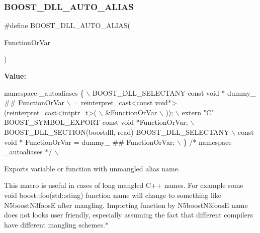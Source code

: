 \subsubsection{\texorpdfstring{B\+O\+O\+S\+T\+\_\+\+D\+L\+L\+\_\+\+A\+U\+T\+O\+\_\+\+A\+L\+I\+AS}{BOOST\_DLL\_AUTO\_ALIAS}}
{\footnotesize\ttfamily \#define B\+O\+O\+S\+T\+\_\+\+D\+L\+L\+\_\+\+A\+U\+T\+O\+\_\+\+A\+L\+I\+AS(\begin{DoxyParamCaption}\item[{}]{Function\+Or\+Var }\end{DoxyParamCaption})}

{\bfseries Value\+:}
\begin{DoxyCode}
\textcolor{keyword}{namespace }\_autoaliases \{                                                                    \(\backslash\)
        BOOST\_DLL\_SELECTANY \textcolor{keyword}{const} \textcolor{keywordtype}{void} * dummy\_ ## FunctionOrVar                                \(\backslash\)
            = \textcolor{keyword}{reinterpret\_cast<}\textcolor{keyword}{const }\textcolor{keywordtype}{void}*\textcolor{keyword}{>}(\textcolor{keyword}{reinterpret\_cast<}intptr\_t\textcolor{keyword}{>}(                         \(\backslash\)
                &FunctionOrVar                                                                  \(\backslash\)
            ));                                                                                 \(\backslash\)
        extern \textcolor{stringliteral}{"C"} BOOST\_SYMBOL\_EXPORT \textcolor{keyword}{const} \textcolor{keywordtype}{void} *FunctionOrVar;                               \(\backslash\)
        BOOST\_DLL\_SECTION(boostdll, read) BOOST\_DLL\_SELECTANY                                   \(\backslash\)
        const \textcolor{keywordtype}{void} * FunctionOrVar = dummy\_ ## FunctionOrVar;                                   \(\backslash\)
    \} \textcolor{comment}{/* namespace \_autoaliases */}                                                              \(\backslash\)
\end{DoxyCode}


Exports variable or function with unmangled alias name. 

This macro is useful in cases of long mangled C++ names. For example some {\ttfamily void boost\+::foo(std\+::sting)} function name will change to something like {\ttfamily N5boost\+N3foosE} after mangling. Importing function by {\ttfamily N5boost\+N3foosE} name does not looks user friendly, especially assuming the fact that different compilers have different mangling schemes.$\ast$

